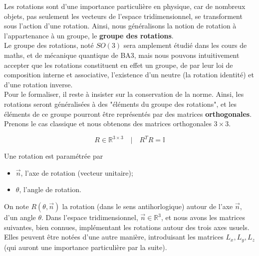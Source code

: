 \documentclass[../notesdecours.tex]{subfiles}
\begin{document}
Les rotations sont d'une importance particulière en physique, car de nombreux objets, pas seulement les vecteurs de l'espace tridimensionnel, se transforment sous l'action d'une rotation. Ainsi, nous généralisons la notion de rotation à l'appartenance à un groupe, le \textbf{groupe des rotations}. \\

Le groupe des rotations, noté $SO(3)$ sera amplement étudié dans les cours de maths, et de mécanique quantique de BA3, mais nous pouvons intuitivement accepter que les rotations constituent en effet un groupe, de par leur loi de composition interne et associative, l'existence d'un neutre (la rotation identité) et d'une rotation inverse. \\

Pour le formaliser, il reste à insister sur la conservation de la norme. Ainsi, les rotations seront généralisées à des "éléments du groupe des rotations", et les éléments de ce groupe pourront être représentés par des matrices \textbf{orthogonales}. Prenons le cas classique et nous obtenons des matrices orthogonales $3\times 3$.

$$R\in \mathbb{R}^{3\times3} \quad |\quad R^T R = \mathbb{I}$$

Une rotation est paramétrée par 
\begin{itemize}
    \item $\vec n$, l'axe de rotation (vecteur unitaire);
    \item $\theta$, l'angle de rotation.
\end{itemize}
On note $R(\theta, \vec n)$ la rotation (dans le sens antihorlogique) autour de l'axe $\vec n$, d'un angle $\theta$. Dans l'espace tridimensionnel, $\vec{n} \in \mathbb{R}^3$, et nous avons les matrices suivantes, bien connues, implémentant les rotations autour des trois axes usuels. Elles peuvent être notées d'une autre manière, introduisant les matrices $L_x, L_y, L_z$ (qui auront une importance particulière par la suite).
\end{document}
